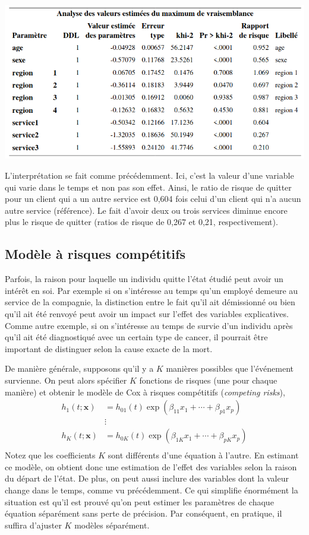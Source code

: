 \documentclass[
  11pt,
  letterpaper,
]{book}
\theoremstyle{definition}
\theoremstyle{definition}
\theoremstyle{definition}
\theoremstyle{definition}
\theoremstyle{remark}
\begin{document}
\begin{center}\includegraphics[width=0.85\linewidth]{figures/05-survie-e22} \end{center}

L'interprétation se fait comme précédemment. Ici, c'est la valeur d'une variable qui varie dans le temps et non pas son effet. Ainsi, le ratio de risque de quitter pour un client qui a un autre service est 0,604 fois celui d'un client qui n'a aucun autre service (référence). Le fait d'avoir deux ou trois services diminue encore plus le risque de quitter (ratios de risque de 0,267 et 0,21, respectivement).

\hypertarget{moduxe8le-uxe0-risques-compuxe9titifs}{%
\subsection{Modèle à risques compétitifs}\label{moduxe8le-uxe0-risques-compuxe9titifs}}

Parfois, la raison pour laquelle un individu quitte l'état étudié peut avoir un intérêt en soi. Par exemple si on s'intéresse au temps qu'un employé demeure au service de la compagnie, la distinction entre le fait qu'il ait démissionné ou bien qu'il ait été renvoyé peut avoir un impact sur l'effet des variables explicatives. Comme autre exemple, si on s'intéresse au temps de survie d'un individu après qu'il ait été diagnostiqué avec un certain type de cancer, il pourrait être important de distinguer selon la cause exacte de la mort.

De manière générale, supposons qu'il y a \(K\) manières possibles que l'événement survienne. On peut alors spécifier \(K\) fonctions de risques (une pour chaque manière) et obtenir le modèle de Cox à risques compétitifs (\emph{competing risks}),
\begin{align*}
h_1(t; \boldsymbol{x})&= h_{01}(t) \exp(\beta_{11}x_1 + \cdots + \beta_{p1} x_p)\\
&\vdots\\
h_K(t; \boldsymbol{x})&= h_{0K}(t) \exp(\beta_{1K}x_1 + \cdots + \beta_{pK} x_p)\\
\end{align*}
Notez que les coefficients \(K\) sont différents d'une équation à l'autre. En estimant ce modèle, on obtient donc une estimation de l'effet des variables selon la raison du départ de l'état. De plus, on peut aussi inclure des variables dont la valeur change dans le temps, comme vu précédemment.
Ce qui simplifie énormément la situation est qu'il est prouvé qu'on peut estimer les paramètres de chaque équation séparément sans perte de précision. Par conséquent, en pratique, il suffira d'ajuster \(K\) modèles séparément.
\end{document}
